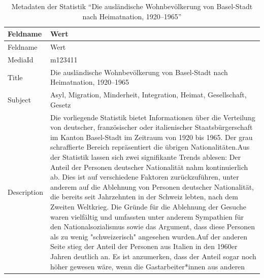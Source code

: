 \documentclass[
  letterpaper,
  DIV=11,
  numbers=noendperiod]{scrartcl}
\begin{document}
\begin{longtable}[]{@{}
  >{\raggedright\arraybackslash}p{}
  >{\raggedright\arraybackslash}p{}@{}}
\caption{Metadaten der Statistik ``Die ausländische Wohnbevölkerung von
Basel-Stadt nach Heimatnation,
1920--1965''}\label{tbl-metadaten-die-auslaendische-wohnbevoelkerung-von-basel-stadt-nach-heimatnation-1920-1965}\tabularnewline
\toprule\noalign{}
\begin{minipage}[b]{\linewidth}\raggedright
Feldname
\end{minipage} & \begin{minipage}[b]{\linewidth}\raggedright
Wert
\end{minipage} \\
\midrule\noalign{}
\endfirsthead
\toprule\noalign{}
\begin{minipage}[b]{\linewidth}\raggedright
Feldname
\end{minipage} & \begin{minipage}[b]{\linewidth}\raggedright
Wert
\end{minipage} \\
\midrule\noalign{}
\endhead
\bottomrule\noalign{}
\endlastfoot
MediaId & m123411 \\
Title & Die ausländische Wohnbevölkerung von Basel-Stadt nach
Heimatnation, 1920--1965 \\
Subject & Asyl, Migration, Minderheit, Integration, Heimat,
Gesellschaft, Gesetz \\
Description & Die vorliegende Statistik bietet Informationen über die
Verteilung von deutscher, französischer oder italienischer
Staatsbürgerschaft im Kanton Basel-Stadt im Zeitraum von 1920 bis 1965.
Der grau schraffierte Bereich repräsentiert die übrigen
Nationalitäten.Aus der Statistik lassen sich zwei signifikante Trends
ablesen: Der Anteil der Personen deutscher Nationalität nahm
kontinuierlich ab. Dies ist auf verschiedene Faktoren zurückzuführen,
unter anderem auf die Ablehnung von Personen deutscher Nationalität, die
bereits seit Jahrzehnten in der Schweiz lebten, nach dem Zweiten
Weltkrieg. Die Gründe für die Ablehnung der Gesuche waren vielfältig und
umfassten unter anderem Sympathien für den Nationalsozialismus sowie das
Argument, dass diese Personen als zu wenig "schweizerisch" angesehen
wurden.Auf der anderen Seite stieg der Anteil der Personen aus Italien
in den 1960er Jahren deutlich an. Es ist anzumerken, dass der Anteil
sogar noch höher gewesen wäre, wenn die Gastarbeiter*innen aus anderen

\end{longtable}
\end{document}
